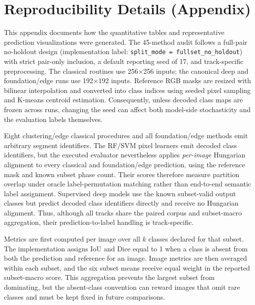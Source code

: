\documentclass{article}
\begin{document}
\section{Reproducibility Details (Appendix)}\label{app:repro}
This appendix documents how the quantitative tables and representative
prediction visualizations were generated. The 45-method audit follows a
full-pair no-holdout design (implementation label:
\texttt{split\_mode = fullset\_no\_holdout}) with strict pair-only inclusion,
a default reporting seed of 17, and track-specific preprocessing. The
classical routines use 256$\times$256 inputs; the canonical deep and
foundation/edge runs use 192$\times$192 inputs. Reference RGB masks are resized
with bilinear interpolation and converted into class indices using seeded
pixel sampling and K-means centroid estimation. Consequently, unless decoded
class maps are frozen across runs, changing the seed can affect both
model-side stochasticity and the evaluation labels themselves.

Eight clustering/edge classical procedures and all foundation/edge methods
emit arbitrary segment identifiers. The RF/SVM pixel learners emit decoded
class identifiers, but the executed evaluator nevertheless applies
\emph{per-image} Hungarian alignment to every classical and foundation/edge
prediction, using the reference mask and known subset phase count. Their scores
therefore measure partition overlap under oracle label-permutation matching
rather than end-to-end semantic label assignment. Supervised deep models use
the known subset-valid output classes but predict decoded class identifiers
directly and receive no Hungarian alignment. Thus, although all tracks share
the paired corpus and subset-macro aggregation, their prediction-to-label
handling is track-specific.

Metrics are first computed per image over all $k$ classes declared for that
subset. The implementation assigns IoU and Dice equal to 1 when a class is
absent from both the prediction and reference for an image. Image metrics are
then averaged within each subset, and the six subset means receive equal
weight in the reported subset-macro score. This aggregation prevents the
largest subset from dominating, but the absent-class convention can reward
images that omit rare classes and must be kept fixed in future comparisons.
\end{document}

